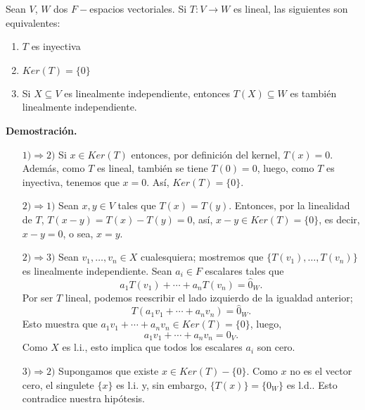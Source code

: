 \begin{prop}
	\label{prop: caracterizacion de inyectividad}
Sean $V$, $W$ dos $F-$espacios vectoriales. Si $T: V \longrightarrow W$
es lineal, las siguientes son equivalentes:
\begin{enumerate}
	\item $T$ es inyectiva
	\item $Ker(T) = \{ 0 \}$
	\item Si $X \subseteq V$ es linealmente independiente,
	entonces $T(X) \subseteq W$ es también linealmente independiente.
\end{enumerate}
\end{prop}
\noindent
\textbf{Demostración.}
\begin{itemize}
 	\item[$1) \Rightarrow 2)$] Si $x \in Ker(T)$ entonces,
 	por definición del kernel, $T(x) = 0$. Además,
 	como $T$ es lineal, también se tiene $T(0) = 0$, luego, como 
 	$T$ es inyectiva, tenemos que $x = 0$. Así, $Ker(T) = \{ 0 \}$.
 	\item[$2) \Rightarrow 1)$] Sean $x, y \in V$ tales que
 	$T(x) = T(y)$. Entonces, por la linealidad de $T$, 
 	$T(x-y) = T(x) - T(y) = 0 $, así, 
 	$x-y \in Ker(T) = \{ 0 \}$, es decir,
 	$x- y = 0$, o sea, $x = y$.
 	\item[$2) \Rightarrow 3)$] Sean $v_{1}, \ldots , v_{n} \in X$
 	cualesquiera; mostremos que $\{ T(v_{1}), \ldots , 
 	T(v_{n}) \}$ es linealmente independiente.
 	Sean $a_{i} \in F$ escalares tales que
 	\[
 	a_{1} T(v_{1}) + \cdots + a_{n} T(v_{n}) = \hat{0}_{W}.
 	\]
 	Por ser $T$ lineal, podemos reescribir el lado izquierdo de la
 	igualdad anterior;
 	\[
 	T(a_{1}v_{1} + \cdots + a_{n}v_{n}) = \hat{0}_{W}.
 	\]
 	Esto muestra que 
 	$a_{1}v_{1} + \cdots + a_{n}v_{n} \in Ker(T) = \{ 0 \}$, luego,
 	\[
 	a_{1}v_{1} + \cdots + a_{n}v_{n} = 0_{V}.
 	\]
 	Como $X$ es l.i., esto implica que todos los escalares
 	$a_{i}$ son cero.
 	\item[$3) \Rightarrow 2)$] Supongamos que existe
 	$x \in Ker(T) - \{ 0 \}$. Como $x$ no es el vector cero, 
 	el singulete $\{ x \}$ es l.i. y, sin embargo, 
 	$\{ T(x) \} = \{ 0_{W} \}$ es l.d.. Esto contradice nuestra
 	hipótesis. 
\end{itemize}

